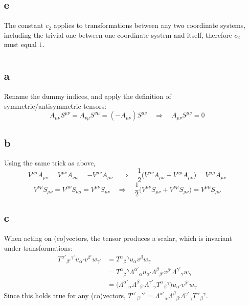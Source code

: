 \documentclass{article}
\begin{document}
\subsection*{e}
The constant $c_2$ applies to transformations between any two coordinate systems, including the trivial one between one coordinate system and itself, therefore $c_2$ must equal $1$.

\section{}
\subsection*{a}
Rename the dummy indices, and apply the definition of symmetric/antisymmetric tensors:
\[ A_{\mu\nu}S^{\mu\nu} = A_{\nu\mu}S^{\nu\mu} = (-A_{\mu\nu})S^{\mu\nu}
	\quad\Rightarrow\quad A_{\mu\nu}S^{\mu\nu} = 0 \]
\subsection*{b}
Using the same trick as above,
\[ V^{\nu\mu}A_{\mu\nu} = V^{\mu\nu}A_{\nu\mu} = - V^{\mu\nu}A_{\mu\nu}
	\quad\Rightarrow\quad \frac{1}{2}\Big( V^{\mu\nu}A_{\mu\nu} - V^{\nu\mu}A_{\mu\nu}\Big) =  V^{\mu\mu}A_{\mu\nu}  \]
\[ V^{\nu\mu}S_{\mu\nu} = V^{\mu\nu}S_{\nu\mu} = V^{\mu\nu}S_{\mu\nu}
	\quad\Rightarrow\quad \frac{1}{2}\Big( V^{\mu\nu}S_{\mu\nu} + V^{\nu\mu}S_{\mu\nu}\Big) =  V^{\mu\mu}S_{\mu\nu}  \]
\subsection*{c}
When acting on (co)vectors, the tensor produces a scalar, which is invariant under transformations: 
\begin{align*}
	 T^{\alpha'}{}_{\beta'}{}^{\gamma'}u_{\alpha'}v^{\beta'}w_{\gamma'} 
	&= T^{\alpha}{}_{\beta}{}^{\gamma}u_{\alpha}v^{\beta}w_{\gamma}\\
	&= T^{\alpha}{}_{\beta}{}^{\gamma}\Lambda^{\alpha'}{}_{\alpha} u_{\alpha'}\Lambda^{\beta}{}_{\beta'}v^{\beta'} \Lambda^{\gamma'}{}_{\gamma}w_{\gamma} \\
	&= \Big(\Lambda^{\alpha'}{}_{\alpha} \Lambda^{\beta}{}_{\beta'} \Lambda^{\gamma'}{}_{\gamma} T^{\alpha}{}_{\beta}{}^{\gamma}\Big) u_{\alpha'}v^{\beta'} w_{\gamma}
\end{align*}
Since this holds true for any (co)vectors, $T^{\alpha'}{}_{\beta'}{}^{\gamma'}= \Lambda^{\alpha'}{}_{\alpha} \Lambda^{\beta}{}_{\beta'} \Lambda^{\gamma'}{}_{\gamma} T^{\alpha}{}_{\beta}{}^{\gamma}$.
\end{document}
